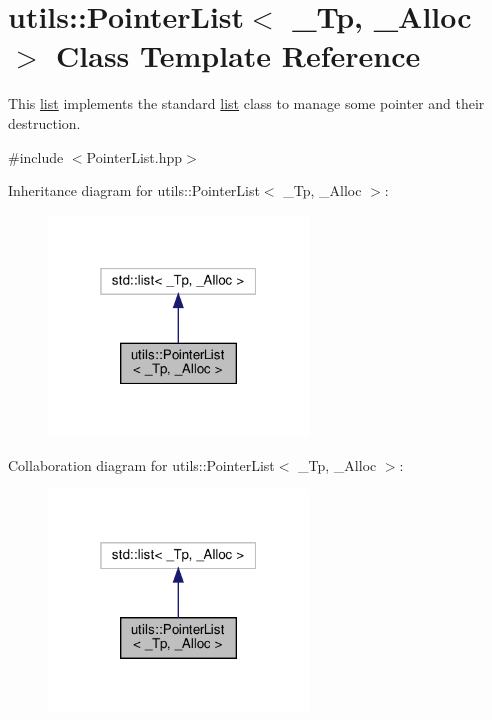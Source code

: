 \hypertarget{classutils_1_1PointerList}{}\section{utils\+:\+:Pointer\+List$<$ \+\_\+\+Tp, \+\_\+\+Alloc $>$ Class Template Reference}
\label{classutils_1_1PointerList}


This \hyperlink{protocollist-p}{list} implements the standard \hyperlink{protocollist-p}{list} class to manage some pointer and their destruction.  




{\ttfamily \#include $<$Pointer\+List.\+hpp$>$}



Inheritance diagram for utils\+:\+:Pointer\+List$<$ \+\_\+\+Tp, \+\_\+\+Alloc $>$\+:
\nopagebreak
\begin{figure}[H]
\begin{center}
\leavevmode
\includegraphics[width=196pt]{classutils_1_1PointerList__inherit__graph}
\end{center}
\end{figure}


Collaboration diagram for utils\+:\+:Pointer\+List$<$ \+\_\+\+Tp, \+\_\+\+Alloc $>$\+:
\nopagebreak
\begin{figure}[H]
\begin{center}
\leavevmode
\includegraphics[width=196pt]{classutils_1_1PointerList__coll__graph}
\end{center}
\end{figure}
